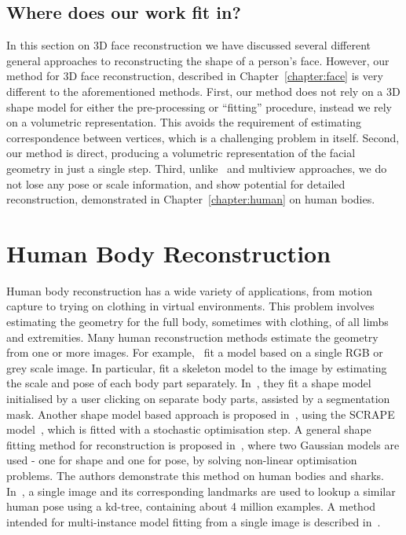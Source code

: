 \subsection{Where does our work fit in?}

In this section on 3D face reconstruction we have discussed several
different general approaches to reconstructing the shape of a person's
face. However, our method for 3D face reconstruction, described in
Chapter~\ref{chapter:face} is very different to the aforementioned
methods. First, our method does not rely on a 3D shape model for
either the pre-processing or ``fitting'' procedure, instead we rely on
a volumetric representation. This avoids the requirement of estimating
correspondence between vertices, which is a challenging problem in
itself. Second, our method is direct, producing a volumetric
representation of the facial geometry in just a single step. Third,
unlike~\cite{tran2018extreme} and multiview approaches, we do not lose
any pose or scale information, and show potential for detailed
reconstruction, demonstrated in Chapter~\ref{chapter:human} on human
bodies.




\section{Human Body Reconstruction}

Human body reconstruction has a wide variety of applications, from
motion capture to trying on clothing in virtual environments. This
problem involves estimating the geometry for the full body, sometimes
with clothing, of all limbs and extremities. Many human reconstruction
methods estimate the geometry from one or more images. For
example,~\cite{balan2007detailed,grest2005human,guan2009estimating}
fit a model based on a single RGB or grey scale image. In particular,
\cite{grest2005human} fit a skeleton model to the image by estimating
the scale and pose of each body part
separately. In~\cite{guan2009estimating}, they fit a shape model
initialised by a user clicking on separate body parts, assisted by a
segmentation mask. Another shape model based approach is proposed
in~\cite{balan2007detailed}, using the SCRAPE
model~\cite{anguelov2005scape}, which is fitted with a stochastic
optimisation step. A general shape fitting method for reconstruction
is proposed in~\cite{chen2010inferring}, where two Gaussian models are
used - one for shape and one for pose, by solving non-linear
optimisation problems. The authors demonstrate this method on human
bodies and sharks. In~\cite{jiang20103d}, a single image and its
corresponding landmarks are used to lookup a similar human pose using
a kd-tree, containing about 4 million examples. A method intended for
multi-instance model fitting from a single image is described
in~\cite{Zanfir_2018_CVPR}.

